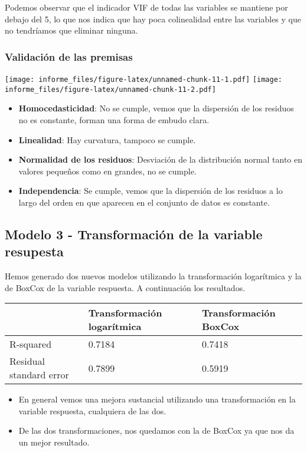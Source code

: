 \documentclass[
]{article}
\providecommand{\tightlist}{%
  \setlength{\itemsep}{0pt}\setlength{\parskip}{0pt}}
\begin{document}
Podemos observar que el indicador VIF de todas las variables se mantiene
por debajo del 5, lo que nos indica que hay poca colinealidad entre las
variables y que no tendríamos que eliminar ninguna.

\hypertarget{validaciuxf3n-de-las-premisas}{%
\subsubsection{Validación de las
premisas}\label{validaciuxf3n-de-las-premisas}}

\texttt{[image: informe\_files/figure-latex/unnamed-chunk-11-1.pdf]}
\texttt{[image: informe\_files/figure-latex/unnamed-chunk-11-2.pdf]}

\begin{itemize}
\tightlist
\item
  \textbf{Homocedasticidad}: No se cumple, vemos que la dispersión de
  los residuos no es constante, forman una forma de embudo clara.
\item
  \textbf{Linealidad}: Hay curvatura, tampoco se cumple.
\item
  \textbf{Normalidad de los residuos}: Desviación de la distribución
  normal tanto en valores pequeños como en grandes, no se cumple.
\item
  \textbf{Independencia}: Se cumple, vemos que la dispersión de los
  residuos a lo largo del orden en que aparecen en el conjunto de datos
  es constante.
\end{itemize}

\hypertarget{modelo-3---transformaciuxf3n-de-la-variable-resupesta}{%
\subsection{Modelo 3 - Transformación de la variable
resupesta}\label{modelo-3---transformaciuxf3n-de-la-variable-resupesta}}

Hemos generado dos nuevos modelos utilizando la transformación
logarítmica y la de BoxCox de la variable respuesta. A continuación los
resultados.

\begin{longtable}[]{@{}lll@{}}
\toprule
& Transformación logarítmica & Transformación BoxCox\tabularnewline
\midrule
\endhead
R-squared & 0.7184 & 0.7418\tabularnewline
Residual standard error & 0.7899 & 0.5919\tabularnewline
\bottomrule
\end{longtable}

\begin{itemize}
\tightlist
\item
  En general vemos una mejora sustancial utilizando una transformación
  en la variable respuesta, cualquiera de las dos.
\item
  De las dos transformaciones, nos quedamos con la de BoxCox ya que nos
  da un mejor resultado.
\end{itemize}
\end{document}
